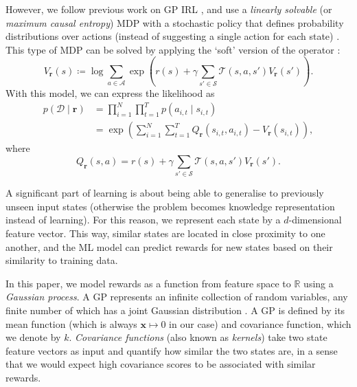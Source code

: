 \documentclass{mpaper}
\newcommand{\V}{V_{\mathbf{r}}}
\begin{document}
However, we follow previous work on GP IRL
\cite{DBLP:conf/nips/LevinePK11,DBLP:conf/uai/JinDAS17}, and use a
\emph{linearly solvable} (or \emph{maximum causal entropy}) MDP with a
stochastic policy that defines probability distributions over actions (instead
of suggesting a single action for each state) \cite{ziebart2008maximum}. This
type of MDP can be solved by applying the `soft' version of the operator
\cite{DBLP:conf/nips/LevinePK11,supplementary_material}:
\begin{equation} \label{eq:update_rule}
  \V(s) \coloneqq \log \sum_{a \in \mathcal{A}} \exp\left( r(s) + \gamma\sum_{s'
      \in \mathcal{S}} \mathcal{T}(s, a, s')\V(s') \right).
\end{equation}
With this model, we can express the likelihood as
\cite{DBLP:conf/uai/JinDAS17,DBLP:conf/nips/LevinePK11}
\begin{align*}
  p(\mathcal{D} \mid \mathbf{r}) &= \prod_{i=1}^N \prod_{t=1}^T p(a_{i,t} \mid s_{i,t}) \\
                                 &= \exp\left( \sum_{i=1}^N \sum_{t=1}^T Q_{\mathbf{r}}(s_{i,t}, a_{i,t}) - \V(s_{i,t}) \right),
\end{align*}
where
\[
  Q_{\mathbf{r}}(s, a) = r(s) + \gamma\sum_{s' \in \mathcal{S}}
  \mathcal{T}(s, a, s')\V(s').
\]

A significant part of learning is about being able to generalise to previously
unseen input states (otherwise the problem becomes knowledge representation
instead of learning). For this reason, we represent each state by a
$d$-dimensional feature vector. This way, similar states are located in close
proximity to one another, and the ML model can predict rewards for new states
based on their similarity to training data.

In this paper, we model rewards as a function from feature space to
$\mathbb{R}$ using a \emph{Gaussian process}. A GP represents an infinite
collection of random variables, any finite number of which has a joint Gaussian
distribution \cite{DBLP:books/lib/RasmussenW06}. A GP is defined by its mean
function (which is always $\mathbf{x} \mapsto 0$ in our case) and covariance
function, which we denote by $k$. \emph{Covariance functions} (also known as
\emph{kernels}) take two state feature vectors as input and quantify how similar
the two states are, in a sense that we would expect high covariance scores to be
associated with similar rewards.
\end{document}
